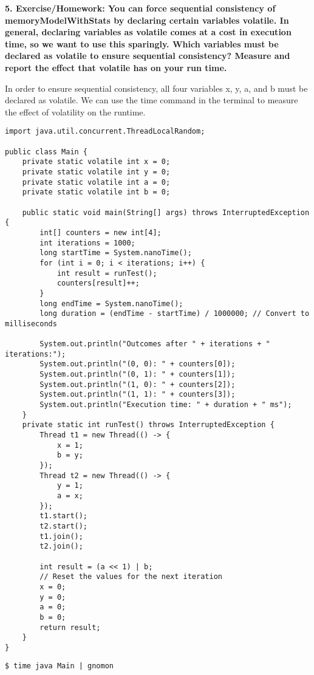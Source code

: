 \documentclass{article}
\theoremstyle{theorem}
\theoremstyle{definition}
\theoremstyle{remark}
\begin{document}
\medskip\noindent
\textbf{5. Exercise/Homework: You can force sequential consistency of memoryModelWithStats by declaring certain variables volatile. In general, declaring variables as volatile comes at a cost in execution time, so we want to use this sparingly. Which variables must be declared as volatile to ensure sequential consistency? Measure and report the effect that volatile has on your run time.}

\medskip\noindent
In order to ensure sequential consistency, all four variables x, y, a, and b must be declared as volatile. We can use the time command in the terminal to measure the effect of volatility on the runtime.

\medskip\noindent
\begin{lstlisting}
import java.util.concurrent.ThreadLocalRandom;

public class Main {
    private static volatile int x = 0;
    private static volatile int y = 0;
    private static volatile int a = 0;
    private static volatile int b = 0;

    public static void main(String[] args) throws InterruptedException {
        int[] counters = new int[4];
        int iterations = 1000;
        long startTime = System.nanoTime();
        for (int i = 0; i < iterations; i++) {
            int result = runTest();
            counters[result]++;
        }
        long endTime = System.nanoTime();
        long duration = (endTime - startTime) / 1000000; // Convert to milliseconds

        System.out.println("Outcomes after " + iterations + " iterations:");
        System.out.println("(0, 0): " + counters[0]);
        System.out.println("(0, 1): " + counters[1]);
        System.out.println("(1, 0): " + counters[2]);
        System.out.println("(1, 1): " + counters[3]);
        System.out.println("Execution time: " + duration + " ms");
    }
    private static int runTest() throws InterruptedException {
        Thread t1 = new Thread(() -> {
            x = 1;
            b = y;
        });
        Thread t2 = new Thread(() -> {
            y = 1;
            a = x;
        });
        t1.start();
        t2.start();
        t1.join();
        t2.join();

        int result = (a << 1) | b;
        // Reset the values for the next iteration
        x = 0;
        y = 0;
        a = 0;
        b = 0;
        return result;
    }
}
\end{lstlisting}

\medskip\noindent
\begin{lstlisting}
$ time java Main | gnomon
\end{lstlisting}
\end{document}
